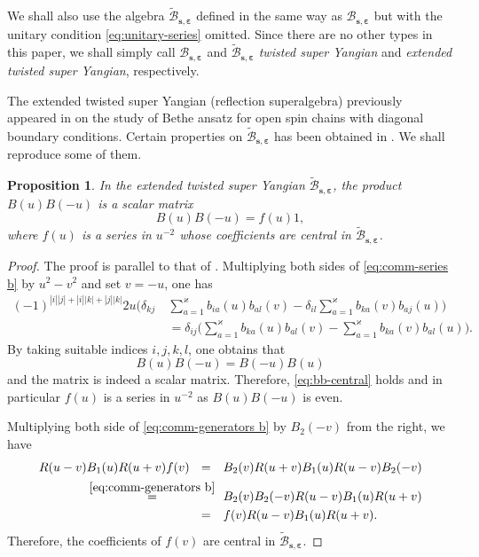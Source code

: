 \documentclass[11pt,reqno]{amsart}
\numberwithin{equation}{section}
\newtheorem{prop}[thm]{Proposition}
\theoremstyle{definition}
\theoremstyle{remark}
\newcommand{\beq}{\begin{equation}}
\newcommand{\eeq}{\end{equation}}
\newcommand{\ka}{\varkappa}
\newcommand{\ve}{\varepsilon}
\begin{document}
We shall also use the algebra $\widetilde{\mathscr B}_{\bm s,\bm\ve}$ defined in the same way as $\mathscr B_{\bm s,\bm\ve}$ but with the unitary condition \eqref{eq:unitary-series} omitted. Since there are no other types in this paper, we shall simply call $\mathscr B_{\bm s,\bm\ve}$ and $\widetilde{\mathscr B}_{\bm s,\bm\ve}$ {\it twisted super Yangian} and {\it extended twisted super Yangian}, respectively.

The extended twisted super Yangian (reflection superalgebra) previously appeared in \cite{Ragoucy2007analytical,Belliard2009nested} on the study of Bethe ansatz for open spin chains with diagonal boundary conditions. Certain properties on $\widetilde{\mathscr B}_{\bm s,\bm\ve}$ has been obtained in \cite{Ragoucy2007analytical,Belliard2009nested}. We shall reproduce some of them.

\begin{prop}
In the extended twisted super Yangian $\widetilde{\mathscr B}_{\bm s,\bm\ve}$, the product $B(u)B(-u)$ is a scalar matrix
\beq\label{eq:bb-central}
B(u)B(-u)=f(u)1,
\eeq
where $f(u)$ is a series in $u^{-2}$ whose coefficients are central in $\widetilde{\mathscr B}_{\bm s,\bm\ve}$.
\end{prop}
\begin{proof}
The proof is parallel to that of \cite[Proposition 2.1]{Molev2002reflection}. Multiplying both sides of \eqref{eq:comm-series b} by $u^2-v^2$ and set $v=-u$, one has
\beq
\begin{split}
(-1)^{|i||j|+|i||k|+|j||k|} 2u\Big(\delta_{kj} &\ \sum_{a=1}^\ka b_{ia}(u)b_{al}(v)-\delta_{il}\sum_{a=1}^\ka b_{ka}(v)b_{aj}(u)\Big)\\
&\ = \delta_{ij}\Big(\sum_{a=1}^\ka b_{ka}(u)b_{al}(v)-\sum_{a=1}^\ka b_{ka}(v)b_{al}(u)\Big).
\end{split}
\eeq
By taking suitable indices $i,j,k,l$, one obtains that
$$
B(u)B(-u)=B(-u)B(u)
$$
and the matrix is indeed a scalar matrix. Therefore, \eqref{eq:bb-central} holds and in particular $f(u)$ is a series in $u^{-2}$ as $B(u)B(-u)$ is even.

Multiplying both side of \eqref{eq:comm-generators b} by $B_2(-v)$ from the right, we have
\begin{align*}
R(u-v)B_1(u)R(u+v)f(v)\  \ =\ \ &\ B_2(v)R(u+v)B_1(u)R(u-v)B_2(-v)\\
\stackrel{\eqref{eq:comm-generators b}}{=}\ & \  B_2(v)B_2(-v)R(u-v)B_1(u)R(u+v)\\
=\ \  &\ f(v)R(u-v)B_1(u)R(u+v).
\end{align*}
Therefore, the coefficients of $f(v)$ are central in $\widetilde{\mathscr B}_{\bm s,\bm\ve}$.
\end{proof}
\end{document}
